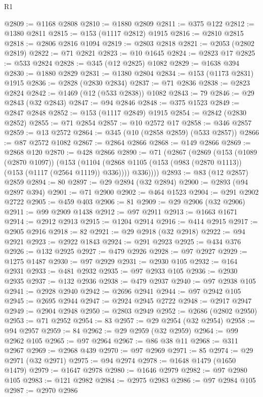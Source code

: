 \begin{lexlean}{R1}
\begin{coremodule}
{{{{{{{{{{{{{{{{{{{{{{{{{{{{{{{{{{{{{{{{{{{{{{{{{{{{{{{{{{{{{{{{{{{{{{{{{{{{{{{{{{{{{{{{{{{{{{{{{{{{{{{{{{{{{{{{{{{{{{{{{{{{{{{{{{{{{{{{{{{{{{{{{{{{{{{{{{{{{{{{{{{{{{{{{{{{{{{{{{{{{{{{{{@2809 := @1168 @2808
@2810 := @1880 @2809
@2811 := @375 @122
@2812 := @1380 @2811
@2815 := @153 (@1117 @2812) @1915
@2816 := @2810 @2815
@2818 := @2806 @2816 @1094
@2819 := @2803 @2818
@2821 := @2053 (@2802 @2819)
@2822 := @71 @2821
@2823 := @10 @1645
@2824 := @2823 @17
@2825 := @533 @2824
@2828 := @345 (@12 @2825) @1082
@2829 := @1638 @394
@2830 := @1880 @2829
@2831 := @1380 @2804
@2834 := @153 (@1173 @2831) @1915
@2836 := @2828 (@2830 @2834)
@2837 := @71 @2836
@2838 := @2823 @2824
@2842 := @1469 (@12 (@533 @2838)) @1082
@2843 := 79
@2846 := @29 @2843 (@32 @2843)
@2847 := @94 @2846
@2848 := @375 @1523
@2849 := @2847 @2848
@2852 := @153 (@1117 @2849) @1915
@2854 := @2842 (@2830 @2852)
@2855 := @71 @2854
@2857 := @10 @2572 @17
@2858 := @346 @2857
@2859 := @13 @2572
@2864 := @345 (@10 (@2858 @2859) (@533 @2857))
@2866 := @87 @2572 @1082
@2867 := @2864 @2866
@2868 := @149 @2866
@2869 := @2868 @120
@2870 := @428 @2866
@2890 := @71
    (@2867
      (@2869
        (@153
          (@1089 (@2870 @1097))
          (@153
            (@1104 (@2868 @1105 (@153 (@983 (@2870 @1113)) (@153 (@1117 (@2564 @1119)) @336))))
            @336))))
@2893 := @83 (@12 @2857) @2859
@2894 := 80
@2897 := @29 @2894 (@32 @2894)
@2900 := @2893 (@94 @2897 @394)
@2901 := @71 @2900
@2902 := @464 @1523
@2904 := @291 @2902 @2722
@2905 := @459 @403
@2906 := 81
@2909 := @29 @2906 (@32 @2906)
@2911 := @99 @2909 @1438
@2912 := @97 @2911
@2913 := @1663 @1671
@2914 := @2912 @2913
@2915 := @1204 @2914
@2916 := @414 @2915
@2917 := @2905 @2916
@2918 := 82
@2921 := @29 @2918 (@32 @2918)
@2922 := @94 @2921
@2923 := @2922 @1843
@2924 := @291 @2923
@2925 := @434 @376
@2926 := @132 @2925
@2927 := @479 @2926
@2928 := @97 @2927
@2929 := @1275 @1487
@2930 := @97 @2929
@2931 := @2930 @105
@2932 := @164 @2931
@2933 := @481 @2932
@2935 := @97 @2933 @105
@2936 := @2930 @2935
@2937 := @132 @2936
@2938 := @479 @2937
@2940 := @97 @2938 @105
@2941 := @2928 @2940
@2942 := @2696 @2941
@2944 := @97 @2942 @105
@2945 := @2695 @2944
@2947 := @2924 @2945 @2722
@2948 := @2917 @2947
@2949 := @2904 @2948
@2950 := @2803 @2949
@2952 := @2686 (@2802 @2950)
@2953 := @71 @2952
@2954 := 83
@2957 := @29 @2954 (@32 @2954)
@2958 := @94 @2957
@2959 := 84
@2962 := @29 @2959 (@32 @2959)
@2964 := @99 @2962 @105
@2965 := @97 @2964
@2967 := @86 @38 @11
@2968 := @311 @2967
@2969 := @2968 @439
@2970 := @97 @2969
@2971 := 85
@2974 := @29 @2971 (@32 @2971)
@2975 := @94 @2974
@2978 := @1648 @1479 (@1650 @1479)
@2979 := @1647 @2978
@2980 := @1646 @2979
@2982 := @97 @2980 @105
@2983 := @121 @2982
@2984 := @2975 @2983
@2986 := @97 @2984 @105
@2987 := @2970 @2986
}}}}}}}}}}}}}}}}}}}}}}}}}}}}}}}}}}}}}}}}}}}}}}}}}}}}}}}}}}}}}}}}}}}}}}}}}}}}}}}}}}}}}}}}}}}}}}}}}}}}}}}}}}}}}}}}}}}}}}}}}}}}}}}}}}}}}}}}}}}}}}}}}}}}}}}}}}}}}}}}}}}}}}}}}}}}}}}}}}}}}}}}}}
\end{coremodule}
\end{lexlean}
